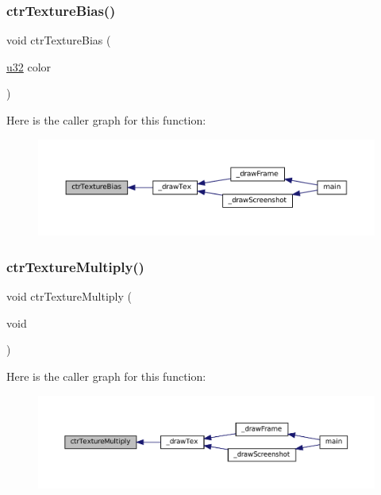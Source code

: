 \subsubsection{\texorpdfstring{ctr\+Texture\+Bias()}{ctrTextureBias()}}
{\footnotesize\ttfamily void ctr\+Texture\+Bias (\begin{DoxyParamCaption}\item[{\mbox{\hyperlink{sqlite3_8c_a03ad5adfaeb9b7640dde78a0cc390319}{u32}}}]{color }\end{DoxyParamCaption})}

Here is the caller graph for this function\+:
\nopagebreak
\begin{figure}[H]
\begin{center}
\leavevmode
\includegraphics[width=350pt]{ctr-gpu_8c_ae1021d5113537160c2b2122305ac6980_icgraph}
\end{center}
\end{figure}
\mbox{\label{ctr-gpu_8c_aa14fb1c5b08247737637c60db4c01b7c}} 
\subsubsection{\texorpdfstring{ctr\+Texture\+Multiply()}{ctrTextureMultiply()}}
{\footnotesize\ttfamily void ctr\+Texture\+Multiply (\begin{DoxyParamCaption}\item[{void}]{ }\end{DoxyParamCaption})}

Here is the caller graph for this function\+:
\nopagebreak
\begin{figure}[H]
\begin{center}
\leavevmode
\includegraphics[width=350pt]{ctr-gpu_8c_aa14fb1c5b08247737637c60db4c01b7c_icgraph}
\end{center}
\end{figure}


